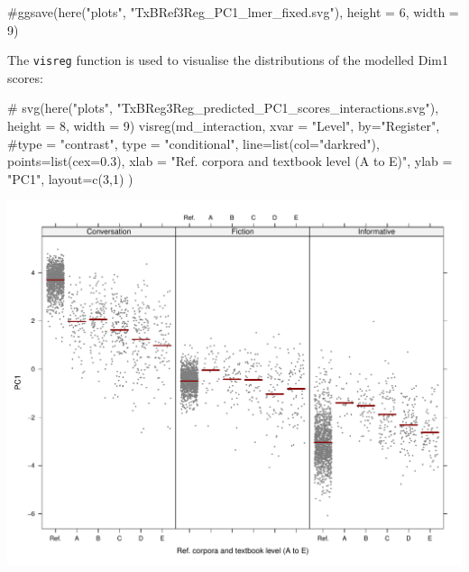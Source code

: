 \documentclass[
  letterpaper,
  DIV=11,
  numbers=noendperiod]{scrreprt}
\newenvironment{Shaded}{\begin{snugshade}}{\end{snugshade}}
\newcommand{\AttributeTok}[1]{\textcolor[rgb]{0.40,0.45,0.13}{#1}}
\newcommand{\CommentTok}[1]{\textcolor[rgb]{0.37,0.37,0.37}{#1}}
\newcommand{\DecValTok}[1]{\textcolor[rgb]{0.68,0.00,0.00}{#1}}
\newcommand{\FloatTok}[1]{\textcolor[rgb]{0.68,0.00,0.00}{#1}}
\newcommand{\FunctionTok}[1]{\textcolor[rgb]{0.28,0.35,0.67}{#1}}
\newcommand{\NormalTok}[1]{\textcolor[rgb]{0.00,0.23,0.31}{#1}}
\newcommand{\StringTok}[1]{\textcolor[rgb]{0.13,0.47,0.30}{#1}}
\begin{document}
\begin{Shaded}
\begin{Highlighting}[]
\CommentTok{\#ggsave(here("plots", "TxBRef3Reg\_PC1\_lmer\_fixed.svg"), height = 6, width = 9)}
\end{Highlighting}
\end{Shaded}

The \texttt{visreg} function is used to visualise the distributions of
the modelled Dim1 scores:

\begin{Shaded}
\begin{Highlighting}[]
\CommentTok{\# svg(here("plots", "TxBReg3Reg\_predicted\_PC1\_scores\_interactions.svg"), height = 8, width = 9)}
\FunctionTok{visreg}\NormalTok{(md\_interaction, }\AttributeTok{xvar =} \StringTok{"Level"}\NormalTok{, }\AttributeTok{by=}\StringTok{"Register"}\NormalTok{, }
       \CommentTok{\#type = "contrast",}
       \AttributeTok{type =} \StringTok{"conditional"}\NormalTok{,}
       \AttributeTok{line=}\FunctionTok{list}\NormalTok{(}\AttributeTok{col=}\StringTok{"darkred"}\NormalTok{), }
       \AttributeTok{points=}\FunctionTok{list}\NormalTok{(}\AttributeTok{cex=}\FloatTok{0.3}\NormalTok{),}
       \AttributeTok{xlab =} \StringTok{"Ref. corpora and textbook level (A to E)"}\NormalTok{, }\AttributeTok{ylab =} \StringTok{"PC1"}\NormalTok{,}
       \AttributeTok{layout=}\FunctionTok{c}\NormalTok{(}\DecValTok{3}\NormalTok{,}\DecValTok{1}\NormalTok{)}
\NormalTok{)}
\end{Highlighting}
\end{Shaded}

\includegraphics{G_Ch7_Analysis_files/figure-pdf/Dim1estimateplots-1.pdf}
\end{document}
